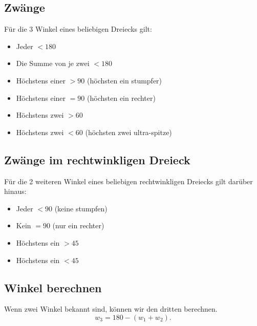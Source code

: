 \documentclass[a4paper]{amsart}
\theoremstyle{definition}
\begin{document}
\subsection{Zwänge}
Für die 3 Winkel eines beliebigen Dreiecks gilt:
\begin{itemize}
   \item Jeder $< 180$
   \item Die Summe von je zwei $< 180$
   \item Höchstens einer $> 90$ (höchsten ein stumpfer)
   \item Höchstens einer $= 90$ (höchsten ein rechter)
   \item Höchstens zwei $> 60$
   \item Höchstens zwei $< 60$ (höchsten zwei ultra-spitze)
\end{itemize}

\subsection{Zwänge im rechtwinkligen Dreieck}
Für die 2 weiteren Winkel eines beliebigen rechtwinkligen Dreiecks gilt darüber hinaus:
\begin{itemize}
   \item Jeder $< 90$ (keine stumpfen)
   \item Kein $= 90$ (nur ein rechter)
   \item Höchstens ein $> 45$
   \item Höchstens ein $< 45$ 
\end{itemize}

\subsection{Winkel berechnen}
Wenn zwei Winkel bekannt sind, können wir den dritten berechnen. 
\begin{equation}\label{berechnen}
   w_3 = 180 - (w_1+w_2).
\end{equation}
\end{document}
